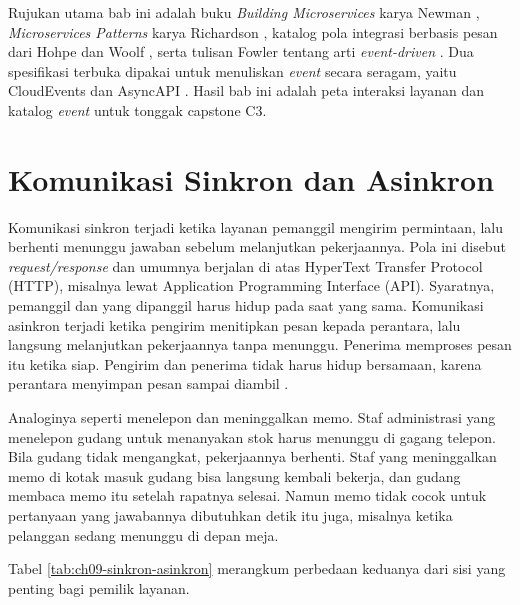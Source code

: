 Rujukan utama bab ini adalah buku \textit{Building Microservices} karya Newman \cite{newman2021},
\textit{Microservices Patterns} karya Richardson \cite{richardson2018}, katalog pola integrasi
berbasis pesan dari Hohpe dan Woolf \cite{c09-hohpe2003}, serta tulisan Fowler tentang arti
\textit{event-driven} \cite{c09-fowler2017}. Dua spesifikasi terbuka dipakai untuk menuliskan
\textit{event} secara seragam, yaitu CloudEvents \cite{c09-cloudevents} dan AsyncAPI
\cite{c09-asyncapi}. Hasil bab ini adalah peta interaksi layanan dan katalog \textit{event} untuk
tonggak capstone C3.

\section{Komunikasi Sinkron dan Asinkron}
\label{sec:ch09-sinkron}

Komunikasi sinkron terjadi ketika layanan pemanggil mengirim permintaan, lalu berhenti menunggu
jawaban sebelum melanjutkan pekerjaannya. Pola ini disebut \textit{request/response} dan umumnya
berjalan di atas HyperText Transfer Protocol (HTTP), misalnya lewat Application Programming
Interface (API). Syaratnya, pemanggil dan yang dipanggil harus hidup pada saat yang sama. Komunikasi
asinkron terjadi ketika pengirim menitipkan pesan kepada perantara, lalu langsung melanjutkan
pekerjaannya tanpa menunggu. Penerima memproses pesan itu ketika siap. Pengirim dan penerima tidak
harus hidup bersamaan, karena perantara menyimpan pesan sampai diambil \cite{newman2021}.

Analoginya seperti menelepon dan meninggalkan memo. Staf administrasi yang menelepon gudang untuk
menanyakan stok harus menunggu di gagang telepon. Bila gudang tidak mengangkat, pekerjaannya
berhenti. Staf yang meninggalkan memo di kotak masuk gudang bisa langsung kembali bekerja, dan gudang
membaca memo itu setelah rapatnya selesai. Namun memo tidak cocok untuk pertanyaan yang jawabannya
dibutuhkan detik itu juga, misalnya ketika pelanggan sedang menunggu di depan meja.

Tabel \ref{tab:ch09-sinkron-asinkron} merangkum perbedaan keduanya dari sisi yang penting bagi
pemilik layanan.

